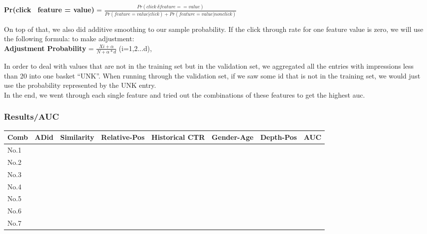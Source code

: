 \documentclass[12pt]{article}
\begin{document}
\vspace*{-10pt}
\textbf{Pr(click \textbar\   feature = value)} = $\frac{Pr(click \ \delta feature==value)}{Pr(feature = value | click)+Pr(feature = value | nonclick)}$ 
\setlength{\parskip}{5 pt}

On top of that, we also did additive smoothing to our sample probability. If the click through rate for one feature value is zero, we will use the following formula: to make adjustment:\\

\vspace*{-8pt}
\textbf{Adjustment Probability} = $\frac{Xi+ \alpha}{N + \alpha*d}$ (i=1,2...d),
\setlength{\parskip}{5 pt}

In order to deal with values that are not in the training set but in the validation set, we aggregated all the entries with impressions less than 20 into one basket “UNK”. When running through the validation set, if we saw some id that is not in the training set, we would just use the probability represented by the UNK entry.\\ 

\vspace*{-8pt}
In the end, we went through each single feature and tried out the combinations of these features to get the highest auc.
\vspace*{-10pt}


\subsubsection{Results/AUC}

\begin{center}
  \begin{tabular}{ l | c | c | c | c | c | c || r }
    \hline
    Comb & ADid & Similarity & Relative-Pos & Historical CTR & Gender-Age & Depth-Pos & AUC \\ \hline
    No.1 &  &  & & & & & \\ \hline
    No.2 &  &  & & & & & \\ \hline
    No.3 &  &  & & & & & \\ \hline
    No.4 &  &  & & & & & \\ \hline
    No.5 &  &  & & & & & \\ \hline
    No.6 &  &  & & & & & \\ \hline
    No.7 &  &  & & & & & \\
    \hline
  \end{tabular}
\end{center}
\end{document}
